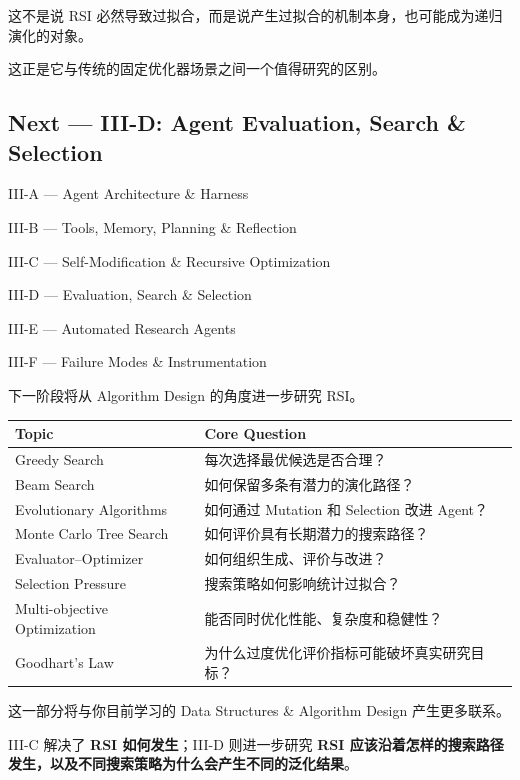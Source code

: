这不是说 RSI 必然导致过拟合，而是说产生过拟合的机制本身，也可能成为递归演化的对象。

这正是它与传统的固定优化器场景之间一个值得研究的区别。

\hypertarget{part-3-37-0001-next-iii-d-agent-evaluation-search-selection}{%
\subsection{Next --- III-D: Agent Evaluation, Search \& Selection}\label{part-3-37-0001-next-iii-d-agent-evaluation-search-selection}}

III-A --- Agent Architecture \& Harness

III-B --- Tools, Memory, Planning \& Reflection

III-C --- Self-Modification \& Recursive Optimization

III-D --- Evaluation, Search \& Selection

III-E --- Automated Research Agents

III-F --- Failure Modes \& Instrumentation

下一阶段将从 Algorithm Design 的角度进一步研究 RSI。

\begin{readertable}
\begin{longtable}[]{@{}
  >{\raggedright\arraybackslash}p{}
  >{\raggedright\arraybackslash}p{}@{}}
\toprule
Topic & Core Question \\
\midrule
\endhead
Greedy Search & 每次选择最优候选是否合理？ \\
Beam Search & 如何保留多条有潜力的演化路径？ \\
Evolutionary Algorithms & 如何通过 Mutation 和 Selection 改进 Agent？ \\
Monte Carlo Tree Search & 如何评价具有长期潜力的搜索路径？ \\
Evaluator--Optimizer & 如何组织生成、评价与改进？ \\
Selection Pressure & 搜索策略如何影响统计过拟合？ \\
Multi-objective Optimization & 能否同时优化性能、复杂度和稳健性？ \\
Goodhart's Law & 为什么过度优化评价指标可能破坏真实研究目标？ \\
\bottomrule
\end{longtable}
\end{readertable}

这一部分将与你目前学习的 Data Structures \& Algorithm Design 产生更多联系。

III-C 解决了 \textbf{RSI 如何发生}；III-D 则进一步研究 \textbf{RSI 应该沿着怎样的搜索路径发生，以及不同搜索策略为什么会产生不同的泛化结果}。

